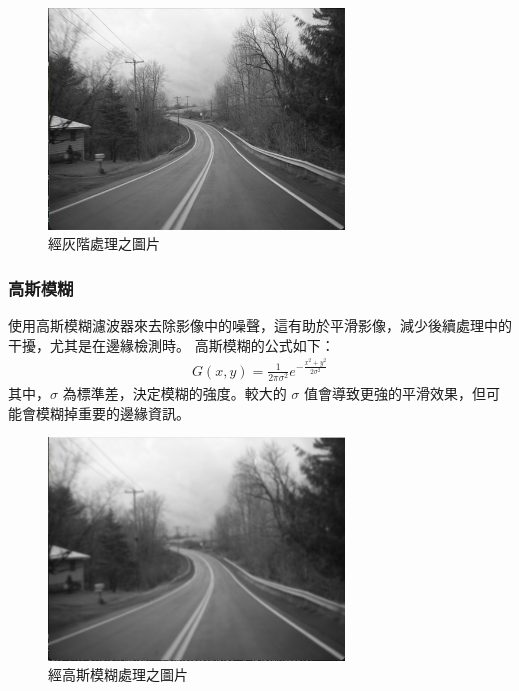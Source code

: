 \documentclass[12pt]{article}       %
\begin{document}
\begin{figure}[H]
    \centering
    \includegraphics[width=0.7\textwidth]{2.png}     %
    \caption{經灰階處理之圖片}    %
    \label{fig:2}    %
\end{figure}

\subsubsection{高斯模糊}
\hspace{2em}使用高斯模糊濾波器來去除影像中的噪聲，這有助於平滑影像，減少後續處理中的干擾，尤其是在邊緣檢測時。
高斯模糊的公式如下：
\begin{align}
G(x,y) = \frac{1}{2\pi\sigma^2} e^{-\frac{x^2 + y^2}{2\sigma^2}}
\end{align}
其中，$\sigma$ 為標準差，決定模糊的強度。較大的 $\sigma$ 值會導致更強的平滑效果，但可能會模糊掉重要的邊緣資訊。
\begin{figure}[H]
    \centering
    \includegraphics[width=0.7\textwidth]{3.png}     %
    \caption{經高斯模糊處理之圖片}    %
    \label{fig:3}    %
\end{figure}
\end{document}
